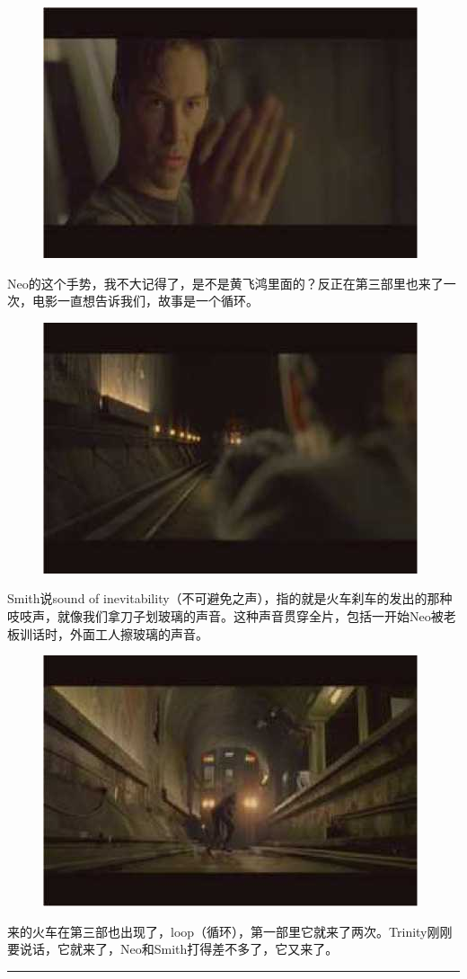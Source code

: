 \documentclass[UTF8]{ctexart}
\newcommand{\myparsep}{\noindent \rule[0.5ex]{\linewidth}{1pt}}
\begin{document}
\begin{figure}[htb]
\centering
\includegraphics[width=0.5\linewidth]{fig/read_Matrix-74}
\end{figure}

Neo的这个手势，我不大记得了，是不是黄飞鸿里面的？反正在第三部里也来了一次，电影一直想告诉我们，故事是一个循环。

\begin{figure}[htb]
\centering
\includegraphics[width=0.5\linewidth]{fig/read_Matrix-75}
\end{figure}

Smith说sound of inevitability（不可避免之声），指的就是火车刹车的发出的那种吱吱声，就像我们拿刀子划玻璃的声音。这种声音贯穿全片，包括一开始Neo被老板训话时，外面工人擦玻璃的声音。

\begin{figure}[htb]
\centering
\includegraphics[width=0.5\linewidth]{fig/read_Matrix-76}
\end{figure}

来的火车在第三部也出现了，loop（循环），第一部里它就来了两次。Trinity刚刚要说话，它就来了，Neo和Smith打得差不多了，它又来了。

\myparsep
\end{document}
